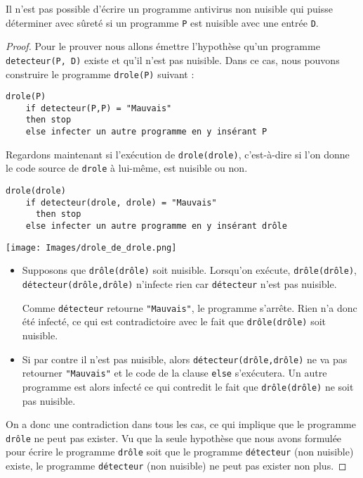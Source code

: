 \begin{mytheo}
	Il n'est pas possible d'écrire un programme antivirus non nuisible
	qui puisse déterminer avec sûreté
	si un programme \lstinline|P| est nuisible avec une entrée \lstinline|D|.
\end{mytheo}
\begin{proof}
	Pour le prouver nous allons émettre l'hypothèse qu'un programme \lstinline|detecteur(P, D)| existe et qu'il n'est pas nuisible. Dans ce cas, nous pouvons construire le programme \lstinline|drole(P)| suivant :

	\label{lst:detecteur_de_virus}
	\begin{lstlisting}
drole(P)
    if detecteur(P,P) = "Mauvais"
    then stop
    else infecter un autre programme en y insérant P
\end{lstlisting}

	Regardons maintenant si l'exécution de \lstinline|drole(drole)|, c'est-à-dire si l'on donne le code source de \lstinline|drole| à lui-même, est nuisible ou non.
	\begin{lstlisting}
drole(drole)
    if detecteur(drole, drole) = "Mauvais"
	  then stop
    else infecter un autre programme en y insérant drôle
\end{lstlisting}

	\begin{center}
		\texttt{[image: Images/drole\_de\_drole.png]}
	\end{center}

\begin{itemize}
	\item Supposons que \lstinline|drôle(drôle)| soit nuisible.
      Lorsqu'on exécute, \lstinline|drôle(drôle)|,
      \lstinline|détecteur(drôle,drôle)| n'infecte rien car \lstinline|détecteur| n'est pas nuisible.

      Comme \lstinline|détecteur| retourne \lstinline|"Mauvais"|,
      le programme s'arrête.
      Rien n'a donc été infecté, ce qui est contradictoire avec le fait que \lstinline|drôle(drôle)| soit nuisible.
	\item Si par contre il n'est pas nuisible, alors \lstinline|détecteur(drôle,drôle)|
      ne va pas retourner \lstinline|"Mauvais"| et le code de la clause \lstinline|else| s'exécutera.
      Un autre programme est alors infecté ce qui contredit le fait que \lstinline|drôle(drôle)| ne soit pas nuisible.
\end{itemize}

On a donc une contradiction dans tous les cas, ce qui implique que le programme \lstinline|drôle| ne peut pas
exister. Vu que la seule hypothèse que nous avons formulée pour écrire le programme \lstinline|drôle| soit que le programme \lstinline|détecteur| (non nuisible) existe,
le programme \lstinline|détecteur| (non nuisible) ne peut pas exister non plus.

\end{proof}

